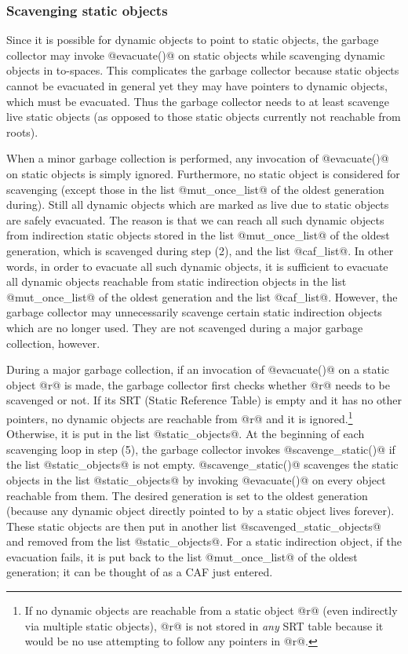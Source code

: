 \documentclass{article}
\begin{document}
\subsubsection{Scavenging static objects}

Since it is possible for dynamic objects to point to static objects,
the garbage collector may invoke @evacuate()@ on static objects 
while scavenging dynamic objects in to-spaces.
This complicates the garbage collector because 
static objects cannot be evacuated in general yet
they may have pointers to dynamic objects, which must be evacuated.
Thus the garbage collector needs to at least scavenge live static objects
(as opposed to those static objects currently not reachable from roots).

When a minor garbage collection is performed, any invocation of
@evacuate()@ on static objects is simply ignored. 
Furthermore, no static object is considered for scavenging
(except those in the list @mut_once_list@ of the oldest generation during).
Still all dynamic objects which are marked as live due to static objects
are safely evacuated.
The reason is that we can reach all such dynamic objects from 
indirection static objects stored in the list 
@mut_once_list@ of the oldest generation, which is scavenged during step (2),
and the list @caf_list@.
In other words, in order to evacuate all such dynamic objects, it is 
sufficient to evacuate all dynamic objects reachable from 
static indirection objects in 
the list @mut_once_list@ of the oldest generation and the list @caf_list@.
However, the garbage collector may unnecessarily scavenge certain static 
indirection objects which are no longer used.
They are not scavenged during a major garbage collection, however.

During a major garbage collection,
if an invocation of @evacuate()@ on a static object @r@ is made,
the garbage collector first checks whether @r@ needs to be scavenged or not.
If its SRT (Static Reference Table) is empty and it has no other pointers, 
no dynamic objects are reachable from @r@ and it is ignored.\footnote{If 
no dynamic objects are reachable from a static object @r@ (even indirectly
via multiple static objects),
@r@ is not stored in \emph{any} SRT table because it would be no use attempting
to follow any pointers in @r@.}
Otherwise, it is put in the list @static_objects@.
At the beginning of each scavenging loop in step (5), 
the garbage collector invokes @scavenge_static()@ if the list @static_objects@
is not empty.
@scavenge_static()@ scavenges the static objects in the list @static_objects@
by invoking @evacuate()@ on every object reachable from them.
The desired generation is set to the oldest generation (because any
dynamic object directly pointed to by a static object lives 
forever).
These static objects are then put in another list @scavenged_static_objects@
and removed from the list @static_objects@.
For a static indirection object, if the evacuation 
fails, it is put back to the list @mut_once_list@ of the oldest generation;
it can be thought of as a CAF just entered.
\end{document}
